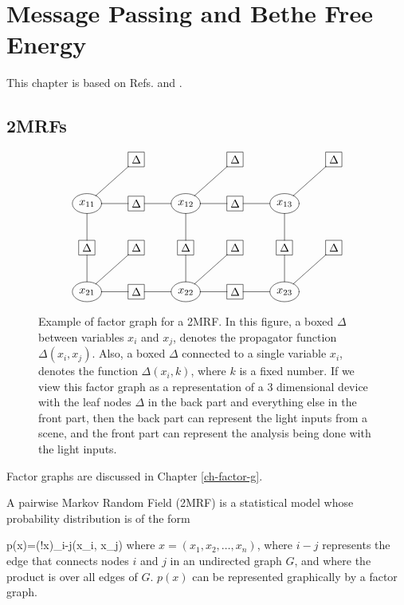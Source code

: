 \chapter{Message Passing and
Bethe Free Energy}
\label{ch-mpass-bethe}

\newcommand{\ttheta}[0]{\TIL{\theta}}
\newcommand{\tP}[0]{\TIL{p}}

This chapter is based
on Refs. \cite{WainJordan}
and \cite{yedidia}.

\section{2MRFs}



\begin{figure}[h!]
$$\xymatrix{
&*+[F]{\Delta}
&
&*+[F]{\Delta}
&
&*+[F]{\Delta}
\\
*++[o][F]{x_{11}}
\ar@{-}[d]\ar@{-}[r]\ar@{-}[ru]
&*+[F]{\Delta}\ar@{-}[r]
&*++[o][F]{x_{12}}\ar@{-}[d]\ar@{-}[r]
\ar@{-}[ru]
&*+[F]{\Delta}\ar@{-}[r]
&*++[o][F]{x_{13}}\ar@{-}[d]
\ar@{-}[ru]
\\
*+[F]{\Delta}\ar@{-}[d]
&*+[F]{\Delta}
&*+[F]{\Delta}\ar@{-}[d]
&*+[F]{\Delta}
&*+[F]{\Delta}\ar@{-}[d]
&*+[F]{\Delta}
\\
*++[o][F]{x_{21}}\ar@{-}[r]\ar@{-}[ru]
&*+[F]{\Delta}\ar@{-}[r]
&*++[o][F]{x_{22}}\ar@{-}[r]\ar@{-}[ru]
&*+[F]{\Delta}\ar@{-}[r]
&*++[o][F]{x_{23}}\ar@{-}[ru]
}$$
\caption{Example
of factor graph
for a 2MRF.
In this figure,
a boxed $\Delta$
between variables $x_i$
and $x_j$,
denotes the propagator  function
$\Delta(x_i, x_j)$.
Also, a boxed
$\Delta$
connected to a
single variable $x_i$,
denotes the function
$\Delta(x_i, k)$,
where $k$
is a fixed number.
If we view this factor graph
as a representation of a 3 dimensional device
with the leaf nodes $\Delta$
in the back part and everything else in the front part,
then the back part can represent the light inputs from a scene, and the front part
can represent the analysis being done
with the light inputs.
}
\label{fig-paiwise-mrf}
\end{figure}

Factor graphs
are discussed in Chapter \ref{ch-factor-g}.

A pairwise Markov Random Field (2MRF)
is a statistical model
whose probability
distribution
is of the form

\beq
p(x)=\caln(!x)\prod_{i-j}\Delta(x_i, x_j)
\label{eq-2mrf}
\eeq
where $x=(x_1, x_2,
\ldots, x_n )$,
where $i-j$
represents the edge
that connects
nodes $i$ and $j$
in an undirected graph $G$,
and where  the product
is over all edges of $G$.
$p(x)$ can be represented
graphically
by a factor graph.


